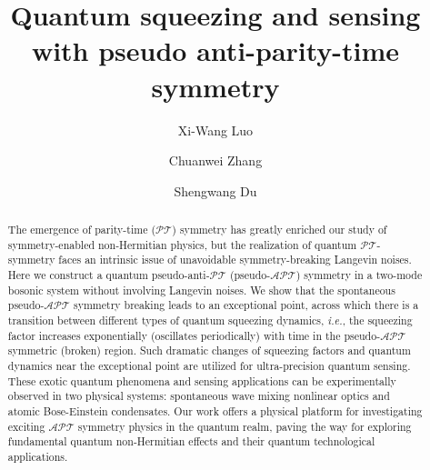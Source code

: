 \documentclass[twocolumn,prl,floatfix,citeautoscript,nofootinbib,superscriptaddress]{revtex4}
\begin{document}
\title{Quantum squeezing and sensing with pseudo anti-parity-time symmetry}
\author{Xi-Wang Luo}
\author{Chuanwei Zhang}
\author{Shengwang Du}

\begin{abstract}
The emergence of parity-time ($\mathcal{PT}$) symmetry has greatly enriched
our study of symmetry-enabled non-Hermitian physics, but the realization of
quantum $\mathcal{PT}$-symmetry faces an intrinsic issue of unavoidable
symmetry-breaking Langevin noises. Here we construct a quantum pseudo-anti-$%
\mathcal{PT}$ (pseudo-$\mathcal{APT}$) symmetry in a two-mode bosonic system
without involving Langevin noises. We show that the spontaneous pseudo-$%
\mathcal{APT}$ symmetry breaking leads to an exceptional point, across which
there is a transition between different types of quantum squeezing dynamics,
\textit{i.e.}, the squeezing factor increases exponentially (oscillates
periodically) with time in the pseudo-$\mathcal{APT}$ symmetric (broken)
region. Such dramatic changes of squeezing factors and quantum dynamics near
the exceptional point are utilized for ultra-precision quantum sensing.
These exotic quantum phenomena and sensing applications can be
experimentally observed in two physical systems: spontaneous wave mixing
nonlinear optics and atomic Bose-Einstein condensates. Our work offers a
physical platform for investigating exciting $\mathcal{APT}$ symmetry
physics in the quantum realm, paving the way for exploring fundamental
quantum non-Hermitian effects and their quantum technological applications.
\end{abstract}

\maketitle
\end{document}
